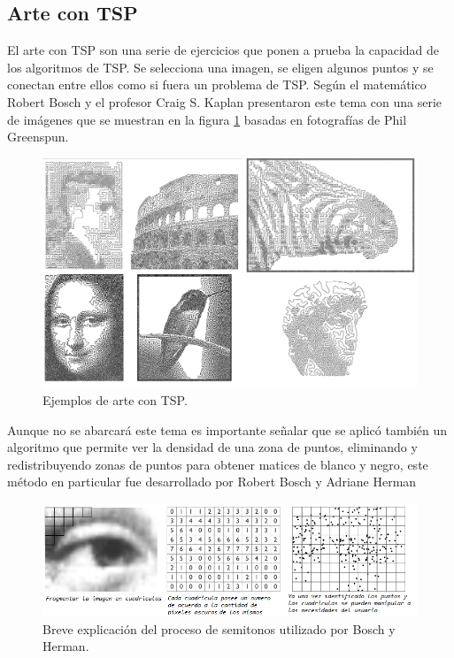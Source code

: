 \subsection{Arte con TSP}
\label{subsection:ARTTSP}
El arte con TSP son una serie de ejercicios que ponen a prueba la capacidad de los algoritmos de TSP. Se selecciona una imagen, se eligen algunos puntos y se conectan entre ellos como si fuera un problema de TSP. Según \cite{[BRIDGES]} el matemático Robert Bosch y el profesor Craig S. Kaplan presentaron este tema con una serie de imágenes que se muestran en la figura \ref{fig:EjemplosTSP.png} basadas en fotografías de Phil Greenspun.\\

     \begin{figure}[hbtp]
        \centering
            \includegraphics[width=1\textwidth]{PruebasResultados/Imagenes/EjemplosTSP.png}
            \caption{Ejemplos de arte con TSP.}
            \label{fig:EjemplosTSP.png}
    \end{figure}
    
\hspace*{1cm} Aunque no se abarcará este tema es importante señalar que se aplicó también un algoritmo que permite ver la densidad de una zona de puntos, eliminando y redistribuyendo zonas de puntos para obtener matices de blanco y negro, este método en particular fue desarrollado por Robert Bosch y Adriane Herman\\

     \begin{figure}[hbtp]
        \centering
            \includegraphics[width=1\textwidth]{PruebasResultados/Imagenes/BoschProceso.png}
            \caption{Breve explicación del proceso de semitonos utilizado por Bosch y Herman.}
            \label{fig:BoschProceso.png}
    \end{figure}
    
